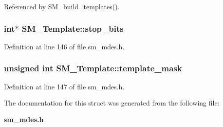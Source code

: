 Referenced by SM\_\-build\_\-templates().
\subsubsection{\setlength{\rightskip}{0pt plus 5cm}int$\ast$ \bf{SM\_\-Template::stop\_\-bits}}\label{structSM__Template_9eba8585dc09cb23d0496c6546260fe1}




Definition at line 146 of file sm\_\-mdes.h.
\subsubsection{\setlength{\rightskip}{0pt plus 5cm}unsigned int \bf{SM\_\-Template::template\_\-mask}}\label{structSM__Template_36e4502620ac85baeac032c5f98870ae}




Definition at line 147 of file sm\_\-mdes.h.

The documentation for this struct was generated from the following file:\begin{CompactItemize}
\item 
\bf{sm\_\-mdes.h}\end{CompactItemize}

